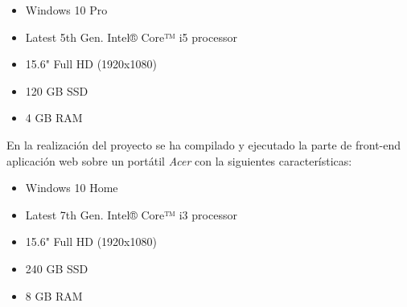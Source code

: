 \documentclass{article}
\begin{document}
\begin{itemize}
	\item Windows 10 Pro
	\item Latest 5th Gen. Intel® Core™ i5 processor
	\item 15.6" Full HD (1920x1080)
	\item 120 GB SSD
	\item 4 GB RAM
\end{itemize}
En la realización del proyecto se ha compilado y ejecutado la parte de front-end aplicación web sobre un portátil \textit{Acer} con la siguientes características:
\begin{itemize}
	\item Windows 10 Home
	\item Latest 7th Gen. Intel® Core™ i3 processor
	\item 15.6" Full HD (1920x1080)
	\item 240 GB SSD
	\item 8 GB RAM
\end{itemize}
\newpage
\end{document}
